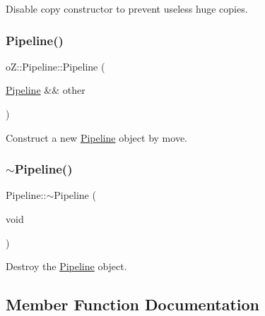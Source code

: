 Disable copy constructor to prevent useless huge copies. 

\mbox{\label{classo_z_1_1_pipeline_a6f9e61063bafb53108f1058f3de8c56a}} 
\subsubsection{\texorpdfstring{Pipeline()}{Pipeline()}\hspace{0.1cm}{\footnotesize\ttfamily [3/3]}}
{\footnotesize\ttfamily o\+Z\+::\+Pipeline\+::\+Pipeline (\begin{DoxyParamCaption}\item[{\mbox{\hyperlink{classo_z_1_1_pipeline}{Pipeline}} \&\&}]{other }\end{DoxyParamCaption})\hspace{0.3cm}{\ttfamily [default]}}



Construct a new \mbox{\hyperlink{classo_z_1_1_pipeline}{Pipeline}} object by move. 

\mbox{\label{classo_z_1_1_pipeline_ae273add0ea7490c0ca4c13cb3683ec6f}} 
\subsubsection{\texorpdfstring{$\sim$Pipeline()}{~Pipeline()}}
{\footnotesize\ttfamily Pipeline\+::$\sim$\+Pipeline (\begin{DoxyParamCaption}\item[{void}]{ }\end{DoxyParamCaption})\hspace{0.3cm}{\ttfamily [virtual]}}



Destroy the \mbox{\hyperlink{classo_z_1_1_pipeline}{Pipeline}} object. 



\subsection{Member Function Documentation}
\mbox{\label{classo_z_1_1_pipeline_aa96f1ef3faeb41c9966d6b5a103fa3a5}} 

